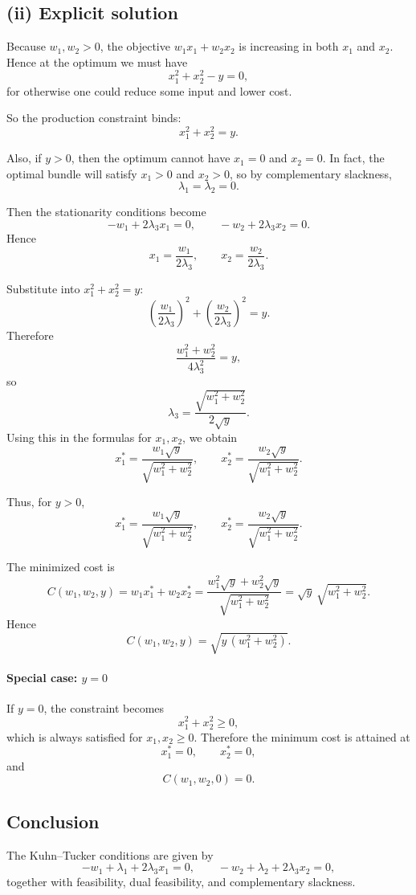 \subsection*{(ii) Explicit solution}

Because \(w_1,w_2>0\), the objective \(w_1x_1+w_2x_2\) is increasing in both \(x_1\) and \(x_2\). Hence at the optimum we must have
\[
x_1^2+x_2^2-y=0,
\]
for otherwise one could reduce some input and lower cost.

So the production constraint binds:
\[
x_1^2+x_2^2=y.
\]

Also, if \(y>0\), then the optimum cannot have \(x_1=0\) and \(x_2=0\). In fact, the optimal bundle will satisfy \(x_1>0\) and \(x_2>0\), so by complementary slackness,
\[
\lambda_1=\lambda_2=0.
\]

Then the stationarity conditions become
\[
-w_1+2\lambda_3x_1=0,
\qquad
-w_2+2\lambda_3x_2=0.
\]
Hence
\[
x_1=\frac{w_1}{2\lambda_3},
\qquad
x_2=\frac{w_2}{2\lambda_3}.
\]

Substitute into \(x_1^2+x_2^2=y\):
\[
\left(\frac{w_1}{2\lambda_3}\right)^2
+
\left(\frac{w_2}{2\lambda_3}\right)^2
=
y.
\]
Therefore
\[
\frac{w_1^2+w_2^2}{4\lambda_3^2}=y,
\]
so
\[
\lambda_3=\frac{\sqrt{w_1^2+w_2^2}}{2\sqrt{y}}.
\]
Using this in the formulas for \(x_1,x_2\), we obtain
\[
x_1^*
=
\frac{w_1\sqrt{y}}{\sqrt{w_1^2+w_2^2}},
\qquad
x_2^*
=
\frac{w_2\sqrt{y}}{\sqrt{w_1^2+w_2^2}}.
\]

Thus, for \(y>0\),
\[
\boxed{
x_1^*
=
\frac{w_1\sqrt{y}}{\sqrt{w_1^2+w_2^2}},
\qquad
x_2^*
=
\frac{w_2\sqrt{y}}{\sqrt{w_1^2+w_2^2}}.
}
\]

The minimized cost is
\[
C(w_1,w_2,y)
=
w_1x_1^*+w_2x_2^*
=
\frac{w_1^2\sqrt{y}+w_2^2\sqrt{y}}{\sqrt{w_1^2+w_2^2}}
=
\sqrt{y}\,\sqrt{w_1^2+w_2^2}.
\]
Hence
\[
\boxed{
C(w_1,w_2,y)=\sqrt{y\,(w_1^2+w_2^2)}.
}
\]

\paragraph{Special case: \(y=0\)}
If \(y=0\), the constraint becomes
\[
x_1^2+x_2^2\ge 0,
\]
which is always satisfied for \(x_1,x_2\ge 0\). Therefore the minimum cost is attained at
\[
\boxed{x_1^*=0,\qquad x_2^*=0,}
\]
and
\[
\boxed{C(w_1,w_2,0)=0.}
\]

\subsection*{Conclusion}

The Kuhn--Tucker conditions are given by
\[
-w_1+\lambda_1+2\lambda_3x_1=0,\qquad
-w_2+\lambda_2+2\lambda_3x_2=0,
\]
together with feasibility, dual feasibility, and complementary slackness.

